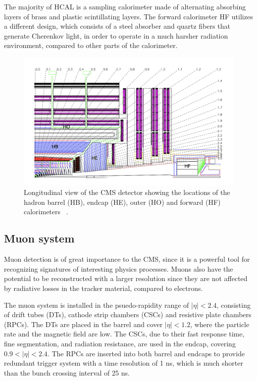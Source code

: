 The majority of HCAL is a sampling calorimeter made of alternating absorbing layers of brass and plastic scintillating layers. 
The forward calorimeter HF utilizes a different design, which consists of a steel absorber and quartz fibers that generate Cherenkov light, 
in order to operate in a much harsher radiation environment, compared to other parts of the calorimeter.

\begin{figure}
    \begin{minipage}[t]{\linewidth}\centering
        \includegraphics[width=15cm]{hcal_layout.png}
    \end{minipage}
    \caption{Longitudinal view of the CMS detector showing the locations of the hadron barrel (HB), endcap (HE), outer (HO) 
    and forward (HF) calorimeters ~\cite{cms:cms_experiment}.}
    \label{fig:hcal_layout}
\end{figure}

\subsection{Muon system}

Muon detection is of great importance to the CMS, since it is a powerful tool for recognizing signatures of interesting physics processes. Muons also have the
potential to be reconstructed with a larger resolution since they are not affected by radiative losses in the tracker material, compared to electrons. 

The muon system is installed in the psuedo-rapidity range of $|\eta| < 2.4$, consisting of drift tubes (DTs), cathode strip chambers (CSCs) and 
resistive plate chambers (RPCs). The DTs are placed in the barrel and cover $|\eta| < 1.2$, where the particle rate and the 
magnetic field are low. The CSCs, due to their fast response time, fine segmentation, and radiation resistance, are used in the endcap, covering
$0.9 < |\eta| < 2.4$. The RPCs are inserted into both barrel and endcaps to provide redundant trigger system with a time resolution of 1 ns, 
which is much shorter than the bunch crossing interval of 25 ns.


